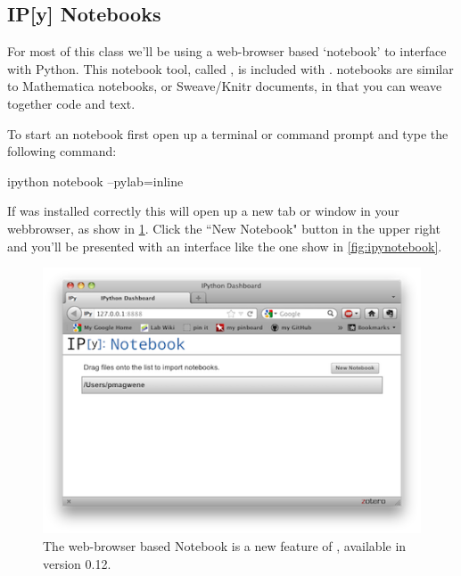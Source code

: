 \subsection{IP[y] Notebooks}

For most of this class we'll be using a web-browser based `notebook' to interface with Python. This notebook tool, called \ipy, is included with \ipython.   \ipy notebooks are similar to Mathematica notebooks, or Sweave/Knitr documents, in that you can weave together code and text.

To start an \ipy notebook first open up a terminal or command prompt and type the following command:
%
\begin{bash}
ipython notebook --pylab=inline
\end{bash}
%
If \ipython was installed correctly this will open up a new tab or window in your webbrowser, as show in \cref{fig:ipystart}. Click the ``New Notebook" button in the upper right and you'll be presented with an interface like the one show in \cref{fig:ipynotebook}.

\begin{figure}[!ht]
    \centering
    \includegraphics[width=0.5\columnwidth]{./figures/hands-on8/ipy-start.png}
    \caption{The web-browser based \ipy Notebook is a new feature of \ipython, available in version 0.12.}\label{fig:ipystart}
\end{figure}

